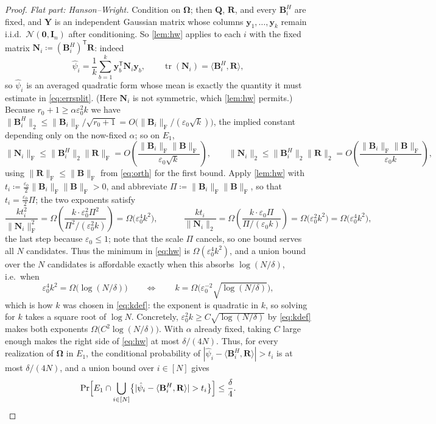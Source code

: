 \documentclass{article}
\renewcommand{\vec}[1]{\mathbf{#1}}          %
\newcommand{\T}{\mathsf{T}}                  %
\newcommand{\F}{\mathrm{F}}                  %
\newcommand{\eps}{\varepsilon}
\newcommand{\inner}[2]{\langle #1, #2 \rangle}
\DeclareMathOperator{\tr}{tr}
\theoremstyle{remark}
\begin{document}
\begin{proof}
\emph{Flat part: Hanson--Wright.}
Condition on $\vec{\Omega}$; then $\vec{Q}$, $\vec{R}$, and every $\vec{B}_i^H$ are fixed, and $\vec{Y}$ is an independent Gaussian matrix whose columns $\vec{y}_1,\dots,\vec{y}_k$ remain i.i.d.\ $\mathcal{N}(\vec 0,\vec{I}_n)$ after conditioning.
So \cref{lem:hw} applies to each $i$ with the fixed matrix $\vec{N}_i \coloneqq (\vec{B}_i^H)^\T \vec{R}$: indeed
\[
\hat{\psi}_i = \frac{1}{k}\sum_{b=1}^{k} \vec{y}_b^\T \vec{N}_i \vec{y}_b ,
\qquad
\tr(\vec{N}_i) = \inner{\vec{B}_i^H}{\vec{R}} ,
\]
so $\hat\psi_i$ is an averaged quadratic form whose mean is exactly the quantity it must estimate in \cref{eq:errsplit}.
(Here $\vec{N}_i$ is not symmetric, which \cref{lem:hw} permits.)
Because $r_0 + 1 \ge \alpha\eps_0^2 k$ we have $\|\vec{B}_i^H\|_2 \le \|\vec{B}_i\|_\F/\sqrt{r_0+1} = O\bigl( \|\vec{B}_i\|_\F/(\eps_0\sqrt{k}) \bigr)$, the implied constant depending only on the now-fixed $\alpha$; so on $E_1$,
\[
\|\vec{N}_i\|_\F \le \|\vec{B}_i^H\|_2 \|\vec{R}\|_\F = O\!\left( \frac{\|\vec{B}_i\|_\F \|\vec{B}\|_\F}{\eps_0 \sqrt{k}} \right),
\qquad
\|\vec{N}_i\|_2 \le \|\vec{B}_i^H\|_2 \|\vec{R}\|_2 = O\!\left( \frac{\|\vec{B}_i\|_\F \|\vec{B}\|_\F}{\eps_0 k} \right),
\]
using $\|\vec{R}\|_\F \le \|\vec{B}\|_\F$ from \cref{eq:orth} for the first bound.
Apply \cref{lem:hw} with $t_i \coloneqq \tfrac{\eps_0}{2}\|\vec{B}_i\|_\F \|\vec{B}\|_\F > 0$, and abbreviate $\Pi \coloneqq \|\vec{B}_i\|_\F\|\vec{B}\|_\F$, so that $t_i = \tfrac{\eps_0}{2}\Pi$; the two exponents satisfy
\[
\frac{k t_i^2}{\|\vec{N}_i\|_\F^2}
= \Omega\!\left( \frac{k \cdot \eps_0^2\Pi^2}{\Pi^2/(\eps_0^2 k)} \right)
= \Omega\bigl( \eps_0^4 k^2 \bigr),
\qquad\quad
\frac{k t_i}{\|\vec{N}_i\|_2}
= \Omega\!\left( \frac{k \cdot \eps_0\Pi}{\Pi/(\eps_0 k)} \right)
= \Omega\bigl( \eps_0^2 k^2 \bigr) = \Omega\bigl( \eps_0^4 k^2 \bigr),
\]
the last step because $\eps_0 \le 1$; note that the scale $\Pi$ cancels, so one bound serves all $N$ candidates.
Thus the minimum in \cref{eq:hw} is $\Omega(\eps_0^4k^2)$, and a union bound over the $N$ candidates is affordable exactly when this absorbs $\log(N/\delta)$, i.e.\ when
\[
\eps_0^4 k^2 = \Omega\bigl( \log(N/\delta) \bigr)
\qquad\Longleftrightarrow\qquad
k = \Omega\bigl( \eps_0^{-2}\sqrt{\log(N/\delta)} \bigr) ,
\]
which is how $k$ was chosen in \cref{eq:kdef}: the exponent is quadratic in $k$, so solving for $k$ takes a square root of $\log N$.
Concretely, $\eps_0^2 k \ge C\sqrt{\log(N/\delta)}$ by \cref{eq:kdef} makes both exponents $\Omega\bigl( C^2\log(N/\delta) \bigr)$.
With $\alpha$ already fixed, taking $C$ large enough makes the right side of \cref{eq:hw} at most $\delta/(4N)$.
Thus, for every realization of $\vec{\Omega}$ in $E_1$, the conditional probability of $|\hat{\psi}_i - \inner{\vec{B}_i^H}{\vec{R}}| > t_i$ is at most $\delta/(4N)$, and a union bound over $i \in [N]$ gives
\[
\Pr\Bigl[ E_1 \cap \bigcup_{i \in [N]} \bigl\{ |\hat{\psi}_i - \inner{\vec{B}_i^H}{\vec{R}}| > t_i \bigr\} \Bigr] \le \frac{\delta}{4} .
\]


\end{proof}
\end{document}

